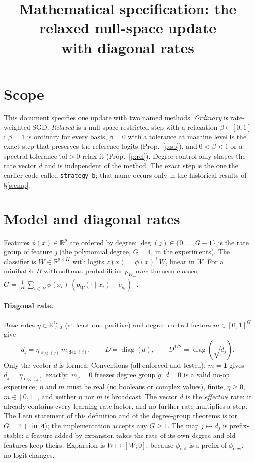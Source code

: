 \documentclass[11pt,a4paper]{article}
\title{Mathematical specification: the relaxed null-space update\\ with diagonal rates}
\author{}\date{}
\theoremstyle{remark}\newtheorem*{rem}{Remark}
\newcommand{\R}{\mathbb{R}}
\DeclareMathOperator{\diag}{diag}
\begin{document}
\maketitle

\section{Scope}
This document specifies one update with two named methods. \emph{Ordinary} is rate-weighted SGD.
\emph{Relaxed} is a null-space-restricted step with a relaxation $\beta\in[0,1]$: $\beta=1$ is ordinary
for every basis, $\beta=0$ with a tolerance at machine level is the exact step that preserves the
reference logits (Prop.~\ref{p:sb}), and $0<\beta<1$ or a spectral tolerance $\mathrm{tol}>0$ relax it
(Prop.~\ref{p:rel}). Degree control only shapes the rate vector $d$ and is independent of the method.
The exact step is the one the earlier code called \texttt{strategy\_b}; that name occurs only in the
historical results of \S\ref{s:emp}.

\section{Model and diagonal rates}
Features $\phi(x)\in\R^p$ are ordered by degree; $\deg(j)\in\{0,\dots,G-1\}$ is the rate group of
feature $j$ (the polynomial degree, $G=4$, in the experiments). The classifier is $W\in\R^{p\times K}$ with logits $z(x)=\phi(x)^\top W$, linear in $W$. For a
minibatch $B$ with softmax probabilities $p_W$ over the seen classes,
$G=\tfrac1{|B|}\sum_{i\in B}\phi(x_i)\,(p_W(\cdot\mid x_i)-e_{y_i})^\top$.

\paragraph{Diagonal rate.} Base rates $\eta\in\R^G_{\ge0}$ (at least one positive) and degree-control
factors $m\in[0,1]^G$ give
\[
d_j=\eta_{\deg(j)}\,m_{\deg(j)},\qquad D=\diag(d),\qquad D^{1/2}=\diag(\sqrt{d_j}).
\]
Only the vector $d$ is formed. Conventions (all enforced and tested): $m=\mathbf 1$ gives $d_j=\eta_{\deg(j)}$
exactly; $m_g=0$ freezes degree group $g$; $d=0$ is a valid no-op experience; $\eta$ and $m$ must be
real (no booleans or complex values), finite, $\eta\ge0$, $m\in[0,1]$, and neither $\eta$ nor $m$ is
broadcast. The vector $d$ is the \emph{effective} rate: it already contains every learning-rate factor,
and no further rate multiplies a step. The Lean statement of this definition and of the degree-group
theorems is for $G=4$ (\texttt{Fin 4}); the implementation accepts any $G\ge1$.
The map $j\mapsto d_j$ is prefix-stable: a feature added by expansion takes the rate of its own degree
and old features keep theirs. Expansion is $W\mapsto[W;0]$; because $\phi_{\text{old}}$ is a prefix of
$\phi_{\text{new}}$, no logit changes.
\end{document}
